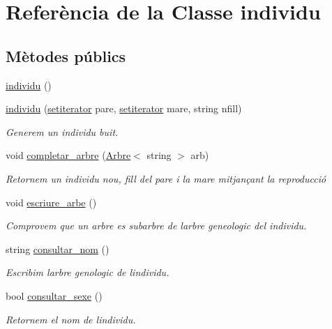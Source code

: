 \hypertarget{classindividu}{}\section{Referència de la Classe individu}
\label{classindividu}
\subsection*{Mètodes públics}
\begin{DoxyCompactItemize}
\item 
\hyperlink{classindividu_af1ba9dc86a04bff6b41ed2d1cf3202b9}{individu} ()
\item 
\hyperlink{classindividu_a6c431979119a07f4dc2be041d6cf73da}{individu} (\hyperlink{individu_8hh_a32dbccbf05588c8c12b0111d5c5c6eb3}{setiterator} pare, \hyperlink{individu_8hh_a32dbccbf05588c8c12b0111d5c5c6eb3}{setiterator} mare, string nfill)
\begin{DoxyCompactList}\small\item\em Generem un individu buit. \end{DoxyCompactList}\item 
void \hyperlink{classindividu_a0ab01155015657b4d6bc9f81972d9fde}{completar\+\_\+arbre} (\hyperlink{class_arbre}{Arbre}$<$ string $>$ arb)
\begin{DoxyCompactList}\small\item\em Retornem un individu nou, fill del pare i la mare mitjançant la reproducció \end{DoxyCompactList}\item 
void \hyperlink{classindividu_a3667eea520362bd57b5d0bce7510ecc2}{escriure\+\_\+arbe} ()
\begin{DoxyCompactList}\small\item\em Comprovem que un arbre es subarbre de l\textquotesingle{}arbre geneologic del individu. \end{DoxyCompactList}\item 
string \hyperlink{classindividu_a524053921304f914deac29c6baa80e15}{consultar\+\_\+nom} ()
\begin{DoxyCompactList}\small\item\em Escribim l\textquotesingle{}arbre genologic de l\textquotesingle{}individu. \end{DoxyCompactList}\item 
bool \hyperlink{classindividu_a30ab21dfd66b20a748bcf41e0b3108a0}{consultar\+\_\+sexe} ()
\begin{DoxyCompactList}\small\item\em Retornem el nom de l\textquotesingle{}individu. \end{DoxyCompactList}\item 

\end{DoxyCompactItemize}
